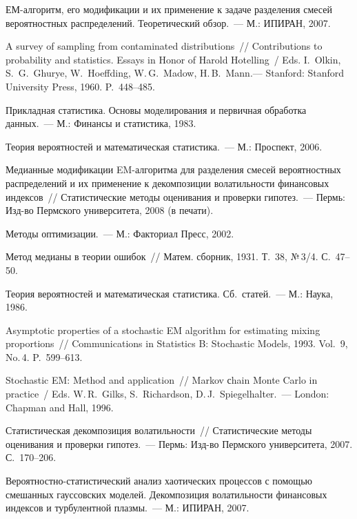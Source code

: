 \begin{multicols}{2}
{{\begin{thebibliography}{99}
ЕМ-алгоритм, его модификации и их
применение к задаче разделения смесей вероятностных распределений.
Теоретический обзор.~--- М.: ИПИРАН, 2007.

A survey of sampling from contaminated distributions~//  Contributions to probability and
statistics. Essays in Honor of Harold Hotelling~/ Eds. I.~Olkin, S.~G.~Ghurye, W.~Hoeffding,
W.\,G.~Madow, H.\,B.~Mann.--- Stanford:
Stanford University Press, 1960. P.~448--485.

Прикладная статистика. Основы
моделирования и первичная обработка данных.~--- М.: Финансы и
статистика, 1983.

Теория вероятностей и математическая статистика.~--- М.: Проспект, 2006.

Медианные модификации EM-алгоритма для разделения смесей вероятностных распределений и их применение к декомпозиции
волатильности финансовых индексов~// Статистические методы оценивания и проверки гипотез.~--- Пермь: Изд-во Пермского
университета, 2008 (в печати).

Методы оптимизации.~--- М.: Факториал Пресс, 2002.


Метод медианы в теории ошибок~//
Матем. сборник, 1931. Т.~38, №\,3/4. С.~47--50.

Теория вероятностей и математическая статистика. Сб.\ статей.~--- М.: Наука, 1986.

Asymptotic properties of a stochastic EM algorithm for estimating mixing
proportions~// Communications in Statistics B: Stochastic Models,
1993. Vol.~9, No.\,4. P.~599--613.

Stochastic EM: Method and application~// Markov сhain Monte Carlo in practice~/
Eds. W.\,R.~Gilks, S.~Richardson,
D.\,J.~Spiegelhalter.~--- London: Chapman and Hall, 1996.

 Статистическая декомпозиция
волатильности~// Статистические методы оценивания и проверки гипотез.~--- Пермь: Изд-во Пермского университета, 2007.
С.~170--206.

\label{end\stat}

Вероятностно-статистический анализ хаотических процессов с помощью смешанных гауссовских моделей.
Декомпозиция волатильности финансовых индексов и турбулентной
плазмы.~--- М.: ИПИРАН, 2007.


\end{thebibliography}
}
}
\end{multicols}